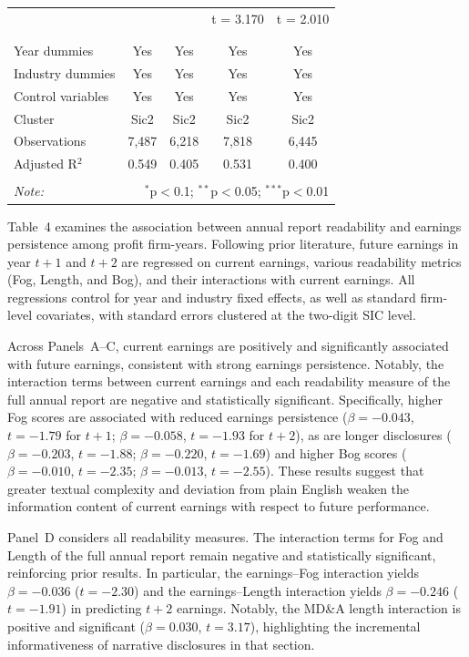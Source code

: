 \documentclass[a4paper]{article}
\begin{document}
\begin{center}
\begin{longtable}{@{\extracolsep{5pt}}lcccc}
  &  &  & t = 3.170 & t = 2.010 \\ 
  & & & & \\ 
\hline \\[-1.8ex] 
Year dummies & Yes & Yes & Yes & Yes \\ 
Industry dummies & Yes & Yes & Yes & Yes \\ 
Control variables & Yes & Yes & Yes & Yes \\ 
Cluster & Sic2 & Sic2 & Sic2 & Sic2 \\ 
Observations & 7,487 & 6,218 & 7,818 & 6,445 \\ 
Adjusted R$^{2}$ & 0.549 & 0.405 & 0.531 & 0.400 \\ 
\hline 
\hline \\[-1.8ex] 
\textit{Note:}  & \multicolumn{4}{r}{$^{*}$p$<$0.1; $^{**}$p$<$0.05; $^{***}$p$<$0.01} \\ 
\end{longtable}
\end{center}

Table~4 examines the association between annual report readability and earnings persistence among profit firm-years. Following prior literature, future earnings in year $t+1$ and $t+2$ are regressed on current earnings, various readability metrics (Fog, Length, and Bog), and their interactions with current earnings. All regressions control for year and industry fixed effects, as well as standard firm-level covariates, with standard errors clustered at the two-digit SIC level.

Across Panels~A–C, current earnings are positively and significantly associated with future earnings, consistent with strong earnings persistence. Notably, the interaction terms between current earnings and each readability measure of the full annual report are negative and statistically significant. Specifically, higher Fog scores are associated with reduced earnings persistence ($\beta = -0.043$, $t = -1.79$ for $t+1$; $\beta = -0.058$, $t = -1.93$ for $t+2$), as are longer disclosures ($\beta = -0.203$, $t = -1.88$; $\beta = -0.220$, $t = -1.69$) and higher Bog scores ($\beta = -0.010$, $t = -2.35$; $\beta = -0.013$, $t = -2.55$). These results suggest that greater textual complexity and deviation from plain English weaken the information content of current earnings with respect to future performance.

Panel~D considers all readability measures. The interaction terms for Fog and Length of the full annual report remain negative and statistically significant, reinforcing prior results. In particular, the earnings–Fog interaction yields $\beta = -0.036$ ($t = -2.30$) and the earnings–Length interaction yields $\beta = -0.246$ ($t = -1.91$) in predicting $t+2$ earnings. Notably, the MD\&A length interaction is positive and significant ($\beta = 0.030$, $t = 3.17$), highlighting the incremental informativeness of narrative disclosures in that section.
\end{document}
